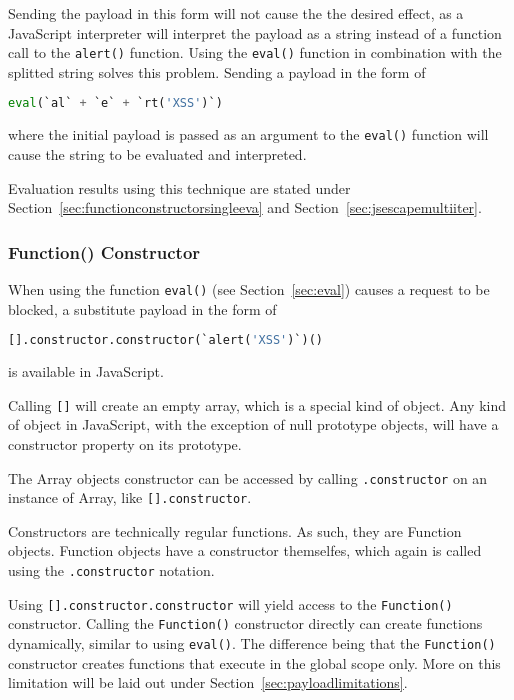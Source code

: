 Sending the payload in this form will not cause the the desired effect, as a JavaScript interpreter will interpret the payload as a string instead of a function call to the \verb|alert()| function.
Using the \verb|eval()| function in combination with the splitted string solves this problem. Sending a payload in the form of 

\begin{lstlisting}[style=basicStyle,language=Python]
eval(`al` + `e` + `rt('XSS')`)
\end{lstlisting}

where the initial payload is passed as an argument to the \verb|eval()| function will cause the string to be evaluated and interpreted. 

Evaluation results using this technique are stated under Section~\ref{sec:functionconstructorsingleeva} and Section~\ref{sec:jsescapemultiiter}.

\subsubsection{Function() Constructor}
\label{sec:functionconstructor}

When using the function \verb|eval()| (see Section~\ref{sec:eval}) causes a request to be blocked, a substitute payload in the form of

\begin{lstlisting}[style=basicStyle,language=Python]
[].constructor.constructor(`alert('XSS')`)()
\end{lstlisting}

is available in JavaScript.

Calling \verb|[]| will create an empty array, which is a special kind of object.
Any kind of object in JavaScript, with the exception of null prototype objects, will have a constructor property on its prototype. \cite{js/object}

The Array objects constructor can be accessed by calling \verb|.constructor| on an instance of Array, like \verb|[].constructor|. \cite{js/array}

Constructors are technically regular functions. As such, they are Function objects. Function objects have a constructor themselfes, which again is called using the \verb|.constructor| notation. \cite{js/constructor}

Using \verb|[].constructor.constructor| will yield access to the \verb|Function()| constructor.
Calling the \verb|Function()| constructor directly can create functions dynamically, similar to using \verb|eval()|.
The difference being that the \verb|Function()| constructor creates functions that execute in the global scope only. More on this limitation will be laid out under Section~\ref{sec:payloadlimitations}.

